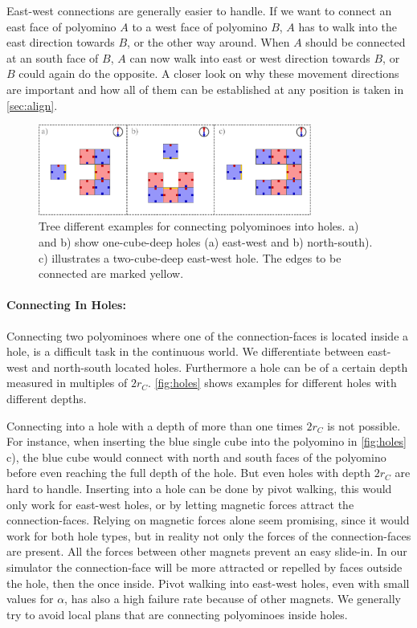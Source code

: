 East-west connections are generally easier to handle.
If we want to connect an east face of polyomino $A$ to a west face of polyomino $B$, $A$ has to walk into the east direction towards $B$, or the other way around.
When $A$ should be connected at an south face of $B$, $A$ can now walk into east or west direction towards $B$, or $B$ could again do the opposite.
A closer look on why these movement directions are important and how all of them can be established at any position is taken in \autoref{sec:align}.

\begin{figure}
	\centering
	\includegraphics[width=0.80\textwidth]{figures/holes.pdf}
	\caption{Tree different examples for connecting polyominoes into holes. a) and b) show one-cube-deep holes (a) east-west and b) north-south). c) illustrates a two-cube-deep east-west hole. The edges to be connected are marked yellow.}
	\label{fig:holes}
\end{figure}

\paragraph{Connecting In Holes:}

Connecting two polyominoes where one of the connection-faces is located inside a hole, is a difficult task in the continuous world.
We differentiate between east-west and north-south located holes.
Furthermore a hole can be of a certain depth measured in multiples of $2 r_C$.
\autoref{fig:holes} shows examples for different holes with different depths.

Connecting into a hole with a depth of more than one times $2 r_C$ is not possible.
For instance, when inserting the blue single cube into the polyomino in \autoref{fig:holes} c), the blue cube would connect with north and south faces of the polyomino before even reaching the full depth of the hole.
But even holes with depth $2 r_C$ are hard to handle.
Inserting into a hole can be done by pivot walking, this would only work for east-west holes, or by letting magnetic forces attract the connection-faces.
Relying on magnetic forces alone seem promising, since it would work for both hole types, but in reality not only the forces of the connection-faces are present.
All the forces between other magnets prevent an easy slide-in.
In our simulator the connection-face will be more attracted or repelled by faces outside the hole, then the once inside.
Pivot walking into east-west holes, even with small values for $\alpha$, has also a high failure rate because of other magnets.
We generally try to avoid local plans that are connecting polyominoes inside holes.  

